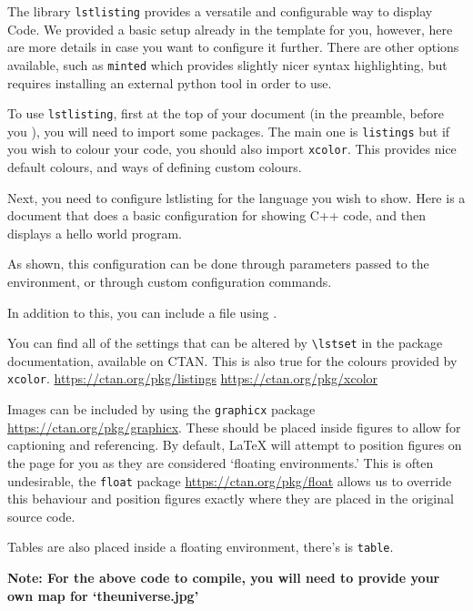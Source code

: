 
The library \verb|lstlisting| provides a versatile and configurable way to display Code.
We provided a basic setup already in the template for you, however, here are more details in case you want to configure it further.
There are other options available, such as \verb|minted| which provides slightly nicer syntax highlighting, but requires installing an external python tool in order to use.

To use \verb|lstlisting|, first at the top of your document (in the preamble, before you \verb||), you will need to import some packages. The main one is \verb|listings| but if you wish to colour your code, you should also import \verb|xcolor|. This provides nice default colours, and ways of defining custom colours.

Next, you need to configure lstlisting for the language you wish to show. Here is a document that does a basic configuration for showing C++ code, and then displays a hello world program.

As shown, this configuration can be done through parameters passed to the environment, or through custom configuration commands.

In addition to this, you can include a file using \verb||.


You can find all of the settings that can be altered by \verb|\lstset| in the package documentation, available on CTAN. This is also true for the colours provided by \verb|xcolor|. \url{https://ctan.org/pkg/listings} \url{https://ctan.org/pkg/xcolor}


Images can be included by using the \verb|graphicx| package \url{https://ctan.org/pkg/graphicx}. These should be placed inside figures to allow for captioning and referencing. By default, \LaTeX{} will attempt to position figures on the page for you as they are considered `floating environments.' This is often undesirable, the \verb|float| package \url{https://ctan.org/pkg/float} allows us to override this behaviour and position figures exactly where they are placed in the original source code.

Tables are also placed inside a floating environment, there's is \verb|table|.


\textbf{Note: For the above code to compile, you will need to provide your own map for `theuniverse.jpg'}

